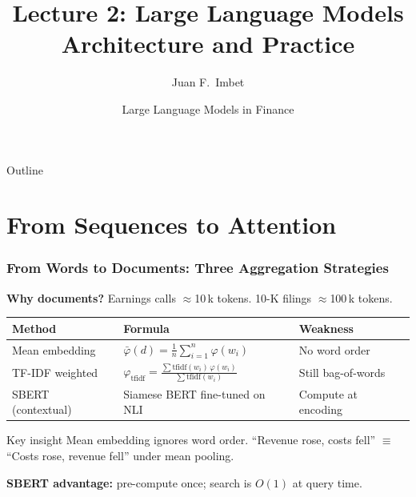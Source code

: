 \documentclass[9pt,t]{beamer}
\title{Lecture 2: Large Language Models\\Architecture and Practice}
\author{Juan F.\ Imbet}
\institute{Paris Dauphine -- PSL University}
\date{Large Language Models in Finance}
\begin{document}
\begin{frame}\titlepage\end{frame}

\begin{frame}{Outline}\tableofcontents\end{frame}

\section{From Sequences to Attention}

\begin{frame}
\frametitle{From Words to Documents: Three Aggregation Strategies}

\textbf{Why documents?} Earnings calls $\approx$10\,k tokens. 10-K filings $\approx$100\,k tokens.

\medskip
\begin{tabular}{lll}
\toprule
\textbf{Method} & \textbf{Formula} & \textbf{Weakness} \\
\midrule
Mean embedding &
  $\bar{\varphi}(d) = \frac{1}{n}\sum_{i=1}^n \varphi(w_i)$ &
  No word order \\[4pt]
TF-IDF weighted &
  $\varphi_{\text{tfidf}} = \frac{\sum \text{tfidf}(w_i)\,\varphi(w_i)}{\sum \text{tfidf}(w_i)}$ &
  Still bag-of-words \\[4pt]
SBERT (contextual) &
  Siamese BERT fine-tuned on NLI &
  Compute at encoding \\
\bottomrule
\end{tabular}

\medskip
\begin{block}{Key insight}
Mean embedding ignores word order.
``Revenue rose, costs fell'' $\equiv$ ``Costs rose, revenue fell'' under mean pooling.
\end{block}

\medskip
\textbf{SBERT advantage:} pre-compute once; search is $O(1)$ at query time.
\end{frame}
\end{document}
